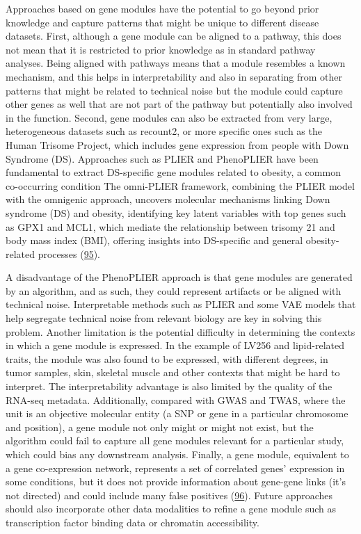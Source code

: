 Approaches based on gene modules have the potential to go beyond prior knowledge and capture patterns that might be unique to different disease datasets.
First, although a gene module can be aligned to a pathway, this does not mean that it is restricted to prior knowledge as in standard pathway analyses.
Being aligned with pathways means that a module resembles a known mechanism, and this helps in interpretability and also in separating from other patterns that might be related to technical noise but the module could capture other genes as well that are not part of the pathway but potentially also involved in the function.
Second, gene modules can also be extracted from very large, heterogeneous datasets such as recount2, or more specific ones such as the Human Trisome Project, which includes gene expression from people with Down Syndrome (DS).
Approaches such as PLIER and PhenoPLIER have been fundamental to extract DS-specific gene modules related to obesity, a common co-occurring condition The omni-PLIER framework, combining the PLIER model with the omnigenic approach, uncovers molecular mechanisms linking Down syndrome (DS) and obesity, identifying key latent variables with top genes such as GPX1 and MCL1, which mediate the relationship between trisomy 21 and body mass index (BMI), offering insights into DS-specific and general obesity-related processes (\protect\hyperlink{ref-B7FF0NeZ}{95}).

A disadvantage of the PhenoPLIER approach is that gene modules are generated by an algorithm, and as such, they could represent artifacts or be aligned with technical noise.
Interpretable methods such as PLIER and some VAE models that help segregate technical noise from relevant biology are key in solving this problem.
Another limitation is the potential difficulty in determining the contexts in which a gene module is expressed.
In the example of LV256 and lipid-related traits, the module was also found to be expressed, with different degrees, in tumor samples, skin, skeletal muscle and other contexts that might be hard to interpret.
The interpretability advantage is also limited by the quality of the RNA-seq metadata.
Additionally, compared with GWAS and TWAS, where the unit is an objective molecular entity (a SNP or gene in a particular chromosome and position), a gene module not only might or might not exist, but the algorithm could fail to capture all gene modules relevant for a particular study, which could bias any downstream analysis.
Finally, a gene module, equivalent to a gene co-expression network, represents a set of correlated genes' expression in some conditions, but it does not provide information about gene-gene links (it's not directed) and could include many false positives (\protect\hyperlink{ref-jVQ2rMqc}{96}).
Future approaches should also incorporate other data modalities to refine a gene module such as transcription factor binding data or chromatin accessibility.

